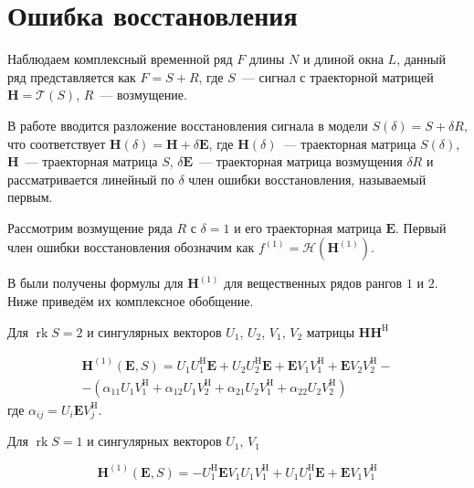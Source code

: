 \documentclass[specialist,
               substylefile = spbu.rtx,
               subf,href,colorlinks=true, 12pt]{disser}
\newtheorem*{def*}{Определение}
\DeclareMathOperator{\rk}{rk}
\begin{document}
\chapter{Ошибка восстановления}

Наблюдаем комплексный временной ряд $F$ длины $N$ и длиной окна $L$, данный ряд представляется как $F = S + R$, где $S$~--- сигнал с траекторной матрицей $\mathbf{H} = \mathcal{T}(S)$, $R$~--- возмущение.

В работе \cite{Nekr2008} вводится разложение восстановления сигнала в модели $S(\delta) = S + \delta R$, что соответствует $\mathbf{H}(\delta) = \mathbf{H} + \delta \mathbf{E}$, где $\mathbf{H}(\delta)$~--- траекторная матрица $S(\delta)$, $\mathbf{H}$~--- траекторная матрица $S$, $\delta\mathbf{E}$~--- траекторная матрица возмущения $\delta R$ и рассматривается линейный по $\delta$ член ошибки восстановления, называемый первым. 

Рассмотрим возмущение ряда $R$ с $\delta = 1$ и его траекторная матрица $\mathbf{E}$. Первый член ошибки восстановления обозначим как $f^{(1)} = \mathcal{H}(\mathbf{H}^{(1)})$. 

В \cite{Nekr2008} были получены формулы для $\mathbf{H}^{(1)}$ для вещественных рядов рангов $1$ и $2$. Ниже приведём их комплексное обобщение.

Для $\rk S = 2$ и сингулярных векторов $U_1$, $U_2$, $V_1$, $V_2$ матрицы $\mathbf{H} \mathbf{H}^{\mathrm{H}}$

\begin{multline}\label{eq:main}
\mathbf{H}^{(1)}(\mathbf{E}, S) = U_1 U^{\mathrm{H}}_1 \mathbf{E} + U_2 U^{\mathrm{H}}_2 \mathbf{E} + \mathbf{E} V_1 V^{\mathrm{H}}_1 + \mathbf{E} V_2 V^{\mathrm{H}}_2 -
 \\
 -(\alpha_{11} U_1 V^{\mathrm{H}}_1 + \alpha_{12} U_1 V^{\mathrm{H}}_2 + \alpha_{21} U_2 V^{\mathrm{H}}_1 + \alpha_{22} U_2 V^{\mathrm{H}}_2)
\end{multline}
где $\alpha_{ij} = U_i \mathbf{E} V^{\mathrm{H}}_j$.

Для $\rk S = 1$ и сингулярных векторов $U_1$, $V_1$ 

\begin{equation} \label{eq:main1}
	\mathbf{H}^{(1)}(\mathbf{E}, S) = -U_1^{\mathrm{H}} \mathbf{E} V_1 U_1 V^{\mathrm{H}}_1 + U_1 U^{\mathrm{H}}_1 \mathbf{E} + \mathbf{E} V_1 V^{\mathrm{H}}_1
\end{equation}
\end{document}
